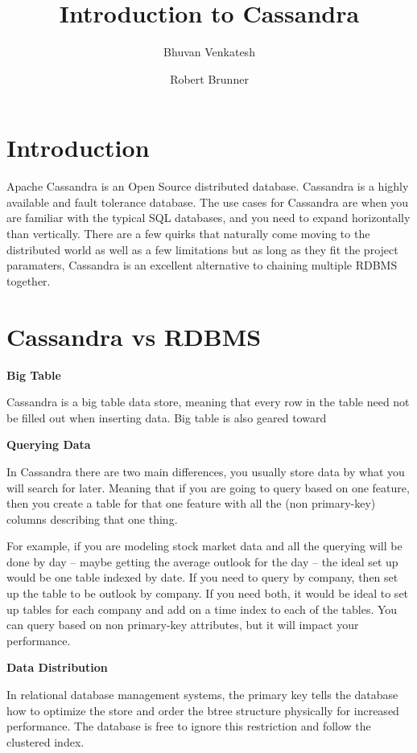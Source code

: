 \documentclass[9pt,twocolumn,twoside]{idsi}
\author[1]{Bhuvan Venkatesh}
\author[2]{Robert Brunner}
\affil[1]{National Center For Supercomputing Applications (NCSA)}
\affil[2]{Laboratory for Computation, Data, and Machine Learning}
\title{Introduction to Cassandra}
\begin{document}

\maketitle

\section{Introduction}

Apache Cassandra is an Open Source distributed database. Cassandra is a highly available and fault tolerance database. The use cases for Cassandra are when you are familiar with the typical SQL databases, and you need to expand horizontally than vertically. There are a few quirks that naturally come moving to the distributed world as well as a few limitations but as long as they fit the project paramaters, Cassandra is an excellent alternative to chaining multiple RDBMS together.

\section{Cassandra vs RDBMS}

\textbf{Big Table}

Cassandra is a big table data store, meaning that every row in the table need not be filled out when inserting data. Big table is also geared toward

\textbf{Querying Data}

In Cassandra there are two main differences, you usually store data by what you will search for later. Meaning that if you are going to query based on one feature, then you create a table for that one feature with all the (non primary-key) columns describing that one thing.

For example, if you are modeling stock market data and all the querying will be done by day -- maybe getting the average outlook for the day -- the ideal set up would be one table indexed by date. If you need to query by company, then set up the table to be outlook by company. If you need both, it would be ideal to set up tables for each company and add on a time index to each of the tables. You can query based on non primary-key attributes, but it will impact your performance.

\textbf{Data Distribution}

In relational database management systems, the primary key tells the database how to optimize the store and order the btree structure physically for increased performance. The database is free to ignore this restriction and follow the clustered index.
\end{document}
